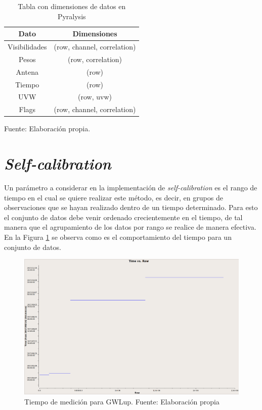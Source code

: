 \begin{table}[!ht]
	\begin{center}
		\caption{Tabla con dimensiones de datos en Pyralysis}
		\begin{tabular}{| c | c |}
			\hline
			Dato & Dimensiones\\ \hline
			Visibilidades & (row, channel, correlation)\\ \hline
            Pesos & (row, correlation)\\ \hline
            Antena & (row) \\ \hline
            Tiempo & (row)\\ \hline
            UVW &  (row, uvw)\\ \hline
            Flags &  (row, channel, correlation)\\ \hline
		\end{tabular}
		\label{tab:shapes}
	\end{center}
	\begin{center}
		Fuente: Elaboración propia.
	\end{center}
\end{table}

\section{\textit{Self-calibration}}


Un parámetro a considerar en la implementación de \textit{self-calibration} es el rango de tiempo en el cual se quiere realizar este método, es decir, en grupos de observaciones que se hayan realizado dentro de un tiempo determinado. Para esto el conjunto de datos debe venir ordenado crecientemente en el tiempo, de tal manera que el agrupamiento de los datos por rango se realice de manera efectiva. En la Figura \ref{fig:time_vs_row} se observa como es el comportamiento del tiempo para un conjunto de datos. 

\begin{figure}[!ht]
	\centering
	\captionsetup{justification=centering}
	\includegraphics[scale=0.3]{images/time_vs_row.png}
	\caption[Tiempo de medición para GWLup]{Tiempo de medición para GWLup. Fuente: Elaboración propia}
	\label{fig:time_vs_row}
\end{figure}

